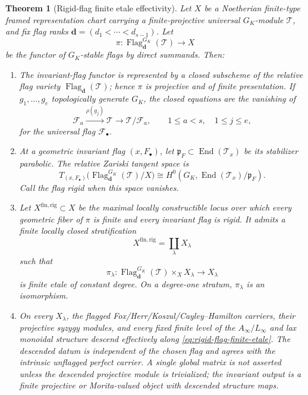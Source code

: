 \documentclass[11pt]{article}
\newtheorem{theorem}{Theorem}[section]
\theoremstyle{definition}
\begin{document}
\begin{theorem}[Rigid-flag finite etale effectivity]\label{thm:rigid-flag-etale-descent}
Let $X$ be a Noetherian finite-type framed representation chart carrying a
finite-projective universal $G_K$-module $\mathcal T$, and fix flag ranks
$\mathbf d=(d_1<\cdots<d_{s-1})$.  Let
\[
 \pi:\operatorname{Flag}^{G_K}_{\mathbf d}(\mathcal T)\longrightarrow X
\]
be the functor of $G_K$-stable flags by direct summands.  Then:

\begin{enumerate}[label=\textnormal{(\roman*)}]
\item The invariant-flag functor is represented by a closed subscheme of the
relative flag variety $\operatorname{Flag}_{\mathbf d}(\mathcal T)$; hence
$\pi$ is projective and of finite presentation.  If
$g_1,\ldots,g_e$ topologically generate $G_K$, the closed equations are the
vanishing of
\begin{equation}\label{eq:invariant-flag-equations}
 \mathcal F_a\xrightarrow{\rho(g_j)}\mathcal T
 \longrightarrow\mathcal T/\mathcal F_a,
 \qquad 1\le a<s,\quad 1\le j\le e,
\end{equation}
for the universal flag $\mathcal F_\bullet$.

\item At a geometric invariant flag $(x,F_\bullet)$, let
$\mathfrak p_F\subset\operatorname{End}(\mathcal T_x)$ be its stabilizer
parabolic.  The relative Zariski tangent space is
\begin{equation}\label{eq:invariant-flag-relative-tangent}
 T_{(x,F_\bullet)}
 \bigl(\operatorname{Flag}^{G_K}_{\mathbf d}(\mathcal T)/X\bigr)
 \cong
 H^0\!\left(G_K,
 \operatorname{End}(\mathcal T_x)/\mathfrak p_F\right).
\end{equation}
Call the flag \emph{rigid} when this space vanishes.

\item Let $X^{\mathrm{fin,rig}}\subset X$ be the maximal locally constructible
locus over which every geometric fiber of $\pi$ is finite and every invariant
flag is rigid.  It admits a finite locally closed stratification
\[
 X^{\mathrm{fin,rig}}=\coprod_\lambda X_\lambda
\]
such that
\begin{equation}\label{eq:rigid-flag-finite-etale}
 \pi_\lambda:
 \operatorname{Flag}^{G_K}_{\mathbf d}(\mathcal T)\times_X X_\lambda
 \longrightarrow X_\lambda
\end{equation}
is finite etale of constant degree.  On a degree-one stratum,
$\pi_\lambda$ is an isomorphism.

\item On every $X_\lambda$, the flagged Fox/Herr/Koszul/Cayley--Hamilton
carriers, their projective syzygy modules, and every fixed finite level of the
$A_\infty/L_\infty$ and lax monoidal structure descend effectively along
\eqref{eq:rigid-flag-finite-etale}.  The descended datum is independent of the
chosen flag and agrees with the intrinsic unflagged perfect carrier.  A single
global matrix is not asserted unless the descended projective module is
trivialized; the invariant output is a finite projective or Morita-valued
object with descended structure maps.
\end{enumerate}
\end{theorem}
\end{document}

